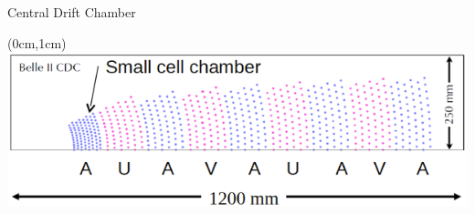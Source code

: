 \documentclass[8pt]{beamer}
\begin{document}
\begin{frame}{Central Drift Chamber}
\begin{textblock*}{6.5cm}
	\end{textblock*}


\begin{textblock*}{10cm}(0cm,1cm)
	\includegraphics[width=\textwidth]{VBilder/cdc}
\end{textblock*}


\end{frame}
\end{document}
